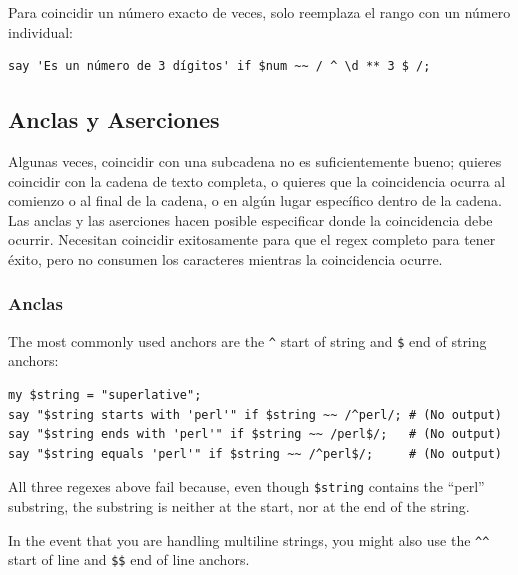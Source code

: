 Para coincidir un número exacto de veces, solo reemplaza el 
rango con un número individual:

\begin{verbatim}
say 'Es un número de 3 dígitos' if $num ~~ / ^ \d ** 3 $ /;
\end{verbatim}
%

\subsection{Anclas y Aserciones}

Algunas veces, coincidir con una subcadena no es suficientemente
bueno; quieres coincidir con la cadena de texto completa, 
o quieres que la coincidencia ocurra al comienzo o al final de la cadena,
o en algún lugar específico dentro de la cadena. Las anclas y las 
aserciones hacen posible especificar donde la coincidencia debe
ocurrir. Necesitan coincidir exitosamente para que el regex completo
para tener éxito, pero no consumen los caracteres mientras la 
coincidencia ocurre.

\subsubsection{Anclas}


The most commonly used anchors are the \verb'^' start of 
string and \verb'$' end of string anchors:

\begin{verbatim}
my $string = "superlative";
say "$string starts with 'perl'" if $string ~~ /^perl/; # (No output)
say "$string ends with 'perl'" if $string ~~ /perl$/;   # (No output)
say "$string equals 'perl'" if $string ~~ /^perl$/;     # (No output)
\end{verbatim}

All three regexes above fail because, even though 
\verb|$string| contains the ``perl'' substring, the 
substring is neither at the start, nor at the end of 
the string.

In the event that you are handling multiline strings, you might 
also use the \verb'^^' start of line and \verb|$$| end of line anchors.

